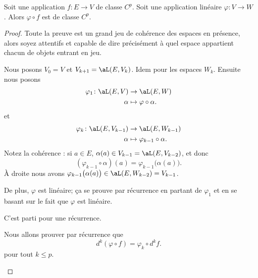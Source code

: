 \begin{proposition}      \label{PROPooRCZOooSgvpSE}
	Soit une application \( f\colon E\to V\) de classe \( C^p\). Soit une application linéaire \( \varphi\colon V \to W\). Alors \( \varphi\circ f\) est de classe \( C^p\).
\end{proposition}

\begin{proof}
	Toute la preuve est un grand jeu de cohérence des espaces en présence, alors soyez attentifs et capable de dire précisément à quel espace appartient chacun de objets entrant en jeu.

	Nous posons \( V_0=V\) et \( V_{k+1}=\aL(E,V_k)\). Idem pour les espaces \( W_k\). Ensuite nous posons
	\begin{equation}
		\begin{aligned}
			\varphi_1\colon \aL(E,V) & \to \aL(E,W)                 \\
			\alpha                   & \mapsto \varphi\circ \alpha.
		\end{aligned}
	\end{equation}
	et
	\begin{equation}
		\begin{aligned}
			\varphi_k\colon \aL(E,V_{k-1}) & \to \aL(E,W_{k-1})                 \\
			\alpha                         & \mapsto \varphi_{k-1}\circ \alpha.
		\end{aligned}
	\end{equation}
	Notez la cohérence : si \( a\in E\), \( \alpha(a)\in V_{k-1}=\aL(E,V_{k-2})\), et donc
	\begin{equation}
		(\varphi_{k-1}\circ\alpha)(a)=\varphi_{k-1}\big( \alpha(a) \big).
	\end{equation}
	À droite nous avons \( \varphi_{k-1}\big( \alpha(a) \big)\in \aL(E,W_{k-2})=V_{k-1}\).

	De plus, \( \varphi\) est linéaire; ça se prouve par récurrence en partant de \( \varphi_1\) et en se basant sur le fait que \( \varphi\) est linéaire.

	C'est parti pour une récurrence.

	\begin{subproof}
		\spitem[Énoncé]
		Nous allons prouver par récurrence que
		\begin{equation}
			d^k(\varphi\circ f)=\varphi_k\circ d^kf.
		\end{equation}
		pour tout \( k\leq p\).
		\spitem[Initialisation]


\end{subproof}
\end{proof}
